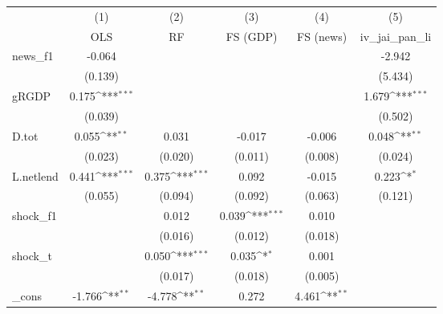{
\def\sym#1{\ifmmode^{#1}\else\(^{#1}\)\fi}
\begin{tabular}{l*{5}{c}}
\toprule
            &\multicolumn{1}{c}{(1)}&\multicolumn{1}{c}{(2)}&\multicolumn{1}{c}{(3)}&\multicolumn{1}{c}{(4)}&\multicolumn{1}{c}{(5)}\\
            &\multicolumn{1}{c}{OLS}&\multicolumn{1}{c}{RF}&\multicolumn{1}{c}{FS (GDP)}&\multicolumn{1}{c}{FS (news)}&\multicolumn{1}{c}{iv\_jai\_pan\_li}\\
\midrule
news\_f1     &      -0.064         &                     &                     &                     &      -2.942         \\
            &     (0.139)         &                     &                     &                     &     (5.434)         \\
\addlinespace
gRGDP       &       0.175\sym{***}&                     &                     &                     &       1.679\sym{***}\\
            &     (0.039)         &                     &                     &                     &     (0.502)         \\
\addlinespace
D.tot       &       0.055\sym{**} &       0.031         &      -0.017         &      -0.006         &       0.048\sym{**} \\
            &     (0.023)         &     (0.020)         &     (0.011)         &     (0.008)         &     (0.024)         \\
\addlinespace
L.netlend   &       0.441\sym{***}&       0.375\sym{***}&       0.092         &      -0.015         &       0.223\sym{*}  \\
            &     (0.055)         &     (0.094)         &     (0.092)         &     (0.063)         &     (0.121)         \\
\addlinespace
shock\_f1    &                     &       0.012         &       0.039\sym{***}&       0.010         &                     \\
            &                     &     (0.016)         &     (0.012)         &     (0.018)         &                     \\
\addlinespace
shock\_t     &                     &       0.050\sym{***}&       0.035\sym{*}  &       0.001         &                     \\
            &                     &     (0.017)         &     (0.018)         &     (0.005)         &                     \\
\addlinespace
\_cons      &      -1.766\sym{**} &      -4.778\sym{**} &       0.272         &       4.461\sym{**} &                     \\

\end{tabular}}
